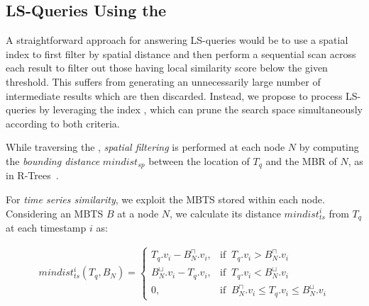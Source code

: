 
\subsection{LS-Queries Using the \btsr}
\label{subsec:local_sim_search_methods}

\graphicspath{{Papers/SSTD2019/}{Papers/SIGSpatial2019/}}

A straightforward approach for answering LS-queries would be to use a spatial index to first filter by spatial distance and then perform a sequential scan across each result to filter out those having local similarity score below the given threshold. This suffers from generating an unnecessarily large number of intermediate results which are then discarded. Instead, we propose to process LS-queries by leveraging the \btsr index \cite{chatzig17btsr}, which can prune the search space simultaneously according to both criteria. 

While traversing the \btsr, {\em spatial filtering} is performed at each node $N$ by computing the {\em bounding distance} $mindist_{sp}$ between the location of $T_q$ and the MBR of $N$, as in R-Trees~\cite{DBLP:conf/sigmod/RoussopoulosKV95}.
  
For {\em time series similarity}, we exploit the MBTS stored within each node. Considering an MBTS $B$ at a node $N$, we calculate its distance $mindist_{ts}^i$ from $T_q$ at each timestamp $i$ as:
  
\begin{equation}
 \begin{split}
  mindist_{ts}^i(T_q, B_N) = \begin{cases}
    T_q.v_i - B_{N}^{\sqcap}.v_i, & \text{if} \;\; T_q.v_i > B_{N}^{\sqcap}.v_i \\
    B_{N}^{\sqcup}.v_i - T_q.v_i, & \text{if} \;\; T_q.v_i < B_{N}^{\sqcup}.v_i \\
    0, & \text{if} \;\; B_{N}^{\sqcap}.v_i \leq T_q.v_i \leq B_{N}^{\sqcup}.v_i
      \end{cases}
 \end{split}
 \label{eq:mindist_ts_local_sim}
\end{equation}

